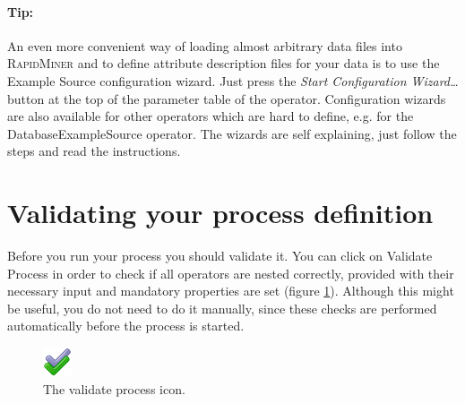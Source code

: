 \documentclass[11pt]{article}
\newcommand{\useroption}[1]{\textsf{#1}}
\newcommand{\rapidminer}{\protect \textsc{RapidMiner}\xspace}
\begin{document}
\paragraph{Tip:}
An even more convenient way of loading almost arbitrary data files into \rapidminer 
and to define attribute description files for your data is to use the Example 
Source configuration wizard. Just press the \emph{Start Configuration Wizard\ldots} 
button at the top of the parameter table of the operator. Configuration wizards are 
also available for other operators which are hard to define, e.g. for the DatabaseExampleSource
operator. The wizards are self explaining, just follow the steps and read the instructions.



\section{Validating your process definition}

Before you run your process you should validate it.
You can click on
\useroption{Validate Process} in order
to check if all operators are nested correctly, provided with their
necessary input and 
mandatory properties are set (figure
\ref{fig:validate_experiment_button}). Although this might be useful,
you do not need to do it manually, since these checks are performed
automatically before the process is started. 
\begin{figure}[ht]
\center
\includegraphics[width=0.08\linewidth]{validate_button.png}
\caption{The validate process icon.}
\label{fig:validate_experiment_button}
\end{figure}
\end{document}

